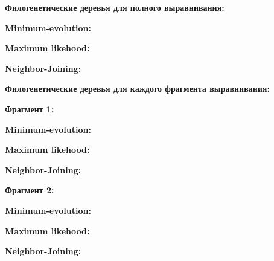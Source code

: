\documentclass{article} %
\begin{document}
\textbf{Филогенетические деревья для полного выравнивания:}

\textbf{Minimum-evolution:}

\begin{figure}[h]
	
\end{figure}

\textbf{Maximum likehood:}

\begin{figure}[h]
	
\end{figure}

\textbf{Neighbor-Joining:}

\begin{figure}[h]
	
\end{figure}

\textbf{Филогенетические деревья для каждого фрагмента \mbox{выравнивания}:}

\textbf{Фрагмент 1:}

\textbf{Minimum-evolution:}

\begin{figure}[h]
	
\end{figure}

\textbf{Maximum likehood:}

\begin{figure}[h]
	
\end{figure}

\textbf{Neighbor-Joining:}

\begin{figure}[h]
	
\end{figure}


\textbf{Фрагмент 2:}

\textbf{Minimum-evolution:}

\begin{figure}[h]
	
\end{figure}

\textbf{Maximum likehood:}

\begin{figure}[h]
	
\end{figure}

\textbf{Neighbor-Joining:}

\begin{figure}[h]
	
\end{figure}
\end{document}
